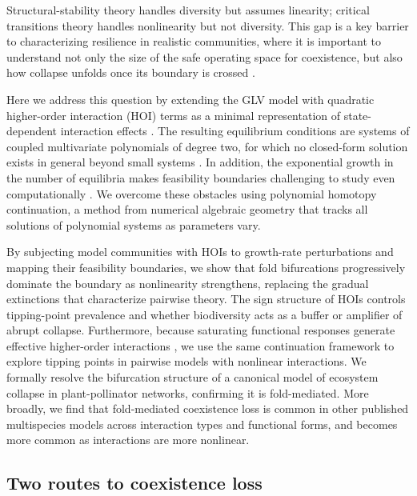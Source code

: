 \documentclass[
 reprint,
 amsmath,
 amssymb,
 aps,
 superscriptaddress,
]{revtex4-2}
\begin{document}
Structural-stability theory handles diversity but assumes linearity; critical transitions theory handles nonlinearity but not diversity. This gap is a key barrier to characterizing resilience in realistic communities, where it is important to understand not only the size of the safe operating space for coexistence, but also how collapse unfolds once its boundary is crossed \cite{bascompte_resilience_2023, lever_foreseeing_2020, kefi_scaling_2022}. 

Here we address this question by extending the GLV model with quadratic higher-order interaction (HOI) terms as a minimal representation of state-dependent interaction effects \cite{kleinhesselink_detecting_2022}. The resulting equilibrium conditions are systems of coupled multivariate polynomials of degree two, for which no closed-form solution exists in general beyond small systems \cite{stewart_galois_1998}. In addition, the exponential growth in the number of equilibria makes feasibility boundaries challenging to study even computationally \cite{aladwani_ecological_2020}. We overcome these obstacles using polynomial homotopy continuation\cite{breiding_homotopycontinuationjl_2018}, a method from numerical algebraic geometry \cite{sommese_numerical_2005} that tracks all solutions of polynomial systems as parameters vary. 

By subjecting model communities with HOIs to growth-rate perturbations and mapping their feasibility boundaries, we show that fold bifurcations progressively dominate the boundary as nonlinearity strengthens, replacing the gradual extinctions that characterize pairwise theory. The sign structure of HOIs controls tipping-point prevalence and whether biodiversity acts as a buffer or amplifier of abrupt collapse. Furthermore, because saturating functional responses generate effective higher-order interactions \cite{letten_mechanistic_2019, abrams_arguments_1983}, we use the same continuation framework to explore tipping points in pairwise models with nonlinear interactions. We formally resolve the bifurcation structure of a canonical model of ecosystem collapse in plant-pollinator networks, confirming it is fold-mediated. More broadly, we find that fold-mediated coexistence loss is common in other published multispecies models across interaction types and functional forms, and becomes more common as interactions are more nonlinear.

\subsection*{Two routes to coexistence loss}
\end{document}
